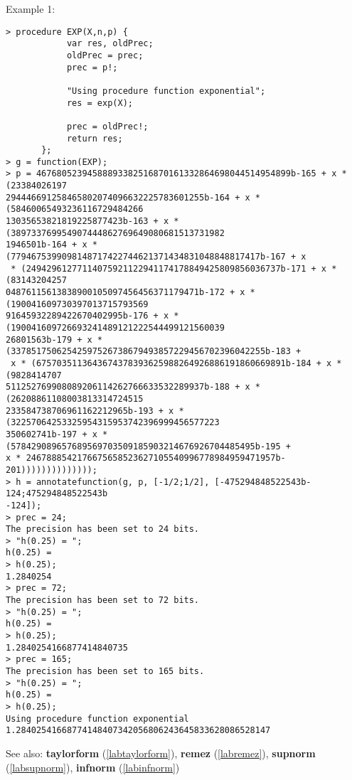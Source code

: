 \noindent Example 1: 
\begin{center}\begin{minipage}{15cm}\begin{Verbatim}[frame=single]
> procedure EXP(X,n,p) {
            var res, oldPrec;
            oldPrec = prec;
            prec = p!;
            
            "Using procedure function exponential";
            res = exp(X);
            
            prec = oldPrec!;
            return res;
       };
> g = function(EXP);
> p = 46768052394588893382516870161332864698044514954899b-165 + x * (23384026197
294446691258465802074096632225783601255b-164 + x * (58460065493236116729484266
13035653821819225877423b-163 + x * (389733769954907444862769649080681513731982
1946501b-164 + x * (7794675399098148717422744621371434831048848817417b-167 + x
 * (24942961277114075921122941174178849425809856036737b-171 + x * (83143204257
04876115613838900105097456456371179471b-172 + x * (190041609730397013715793569
91645932289422670402995b-176 + x * (190041609726693241489121222544499121560039
26801563b-179 + x * (33785175062542597526738679493857229456702396042255b-183 +
 x * (6757035113643674378393625988264926886191860669891b-184 + x * (9828414707
511252769908089206114262766633532289937b-188 + x * (26208861108003813314724515
233584738706961162212965b-193 + x * (32257064253325954315953742396999456577223
350602741b-197 + x * (578429089657689569703509185903214676926704485495b-195 + 
x * 2467888542176675658523627105540996778984959471957b-201))))))))))))));
> h = annotatefunction(g, p, [-1/2;1/2], [-475294848522543b-124;475294848522543b
-124]);
> prec = 24;
The precision has been set to 24 bits.
> "h(0.25) = ";
h(0.25) = 
> h(0.25);
1.2840254
> prec = 72;
The precision has been set to 72 bits.
> "h(0.25) = ";
h(0.25) = 
> h(0.25);
1.2840254166877414840735
> prec = 165;
The precision has been set to 165 bits.
> "h(0.25) = ";
h(0.25) = 
> h(0.25);
Using procedure function exponential
1.28402541668774148407342056806243645833628086528147
\end{Verbatim}
\end{minipage}\end{center}
See also: \textbf{taylorform} (\ref{labtaylorform}), \textbf{remez} (\ref{labremez}), \textbf{supnorm} (\ref{labsupnorm}), \textbf{infnorm} (\ref{labinfnorm})
